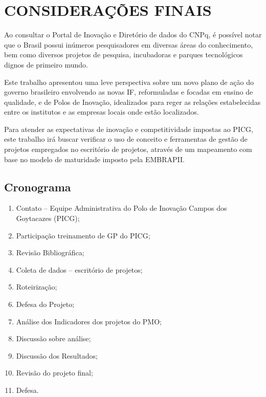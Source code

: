 \chapter{CONSIDERAÇÕES FINAIS}
\thispagestyle{empty}

Ao consultar o Portal de Inovação e Diretório de dados do CNPq, é possível notar que o Brasil possui inúmeros pesquisadores em diversas áreas do conhecimento, bem como diversos projetos de pesquisa, incubadoras e parques tecnológicos dignos de primeiro mundo.

Este trabalho apresentou uma leve perspectiva sobre um novo plano de ação do governo brasileiro envolvendo as novas IF, reformuladas e focadas em ensino de qualidade, e de Polos de Inovação, idealizados para reger as relações estabelecidas entre os institutos e as empresas locais onde estão localizados.

Para atender as expectativas de inovação e competitividade impostas ao PICG, este trabalho irá buscar verificar o uso de conceito e ferramentas de gestão de projetos empregados no escritório de projetos, através de um mapeamento com base no modelo de maturidade imposto pela EMBRAPII.


\newpage
\thispagestyle{empty}
\singlespacing
\section{Cronograma}

\begin{enumerate}
  \item{Contato – Equipe Administrativa do Polo de Inovação Campos dos Goytacazes (PICG);}
  \item{Participação treinamento de GP do PICG;}
  \item{Revisão Bibliográfica;}
  \item{Coleta de dados – escritório de projetos;}
  \item{Roteirização;}
  \item{Defesa do Projeto;}
  \item{Análise dos Indicadores dos projetos do PMO;}
  \item{Discussão sobre análise;}
  \item{Discussão dos Resultados;}
  \item{Revisão do projeto final;}
  \item{Defesa.}
\end{enumerate}

